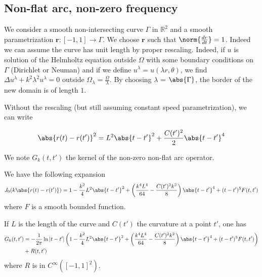 \documentclass[]{article}
\begin{document}
\subsection{Non-flat arc, non-zero frequency}


We consider a smooth non-intersecting curve $\Gamma$ in $\mathbb{R}^2$ and a smooth parametrization $\textbf{r}: [-1,1] \to \Gamma$. We choose $\textbf{r}$ such that $\norm{\frac{dr}{dt}} = 1$. Indeed we can assume the curve has unit length by proper rescaling. Indeed, if $u$ is solution of the Helmholtz equation outside $\Omega$ with some boundary conditions on $\Gamma$ (Dirichlet or Neuman) and if we define $u^\lambda = u(\lambda r, \theta)$, we find $\Delta u^{\lambda} + k^2 \lambda^2 u^{\lambda} = 0$ outside $\Omega_{\lambda} = \frac{\Omega}{\lambda}$. By choosing $\lambda$ = $\abs{\Gamma}$, the border of the new domain is of length $1$. 

Without the rescaling (but still assuming constant speed parametrization), we can write 

\[\abs{r(t) - r(t')}^2 = L^2\abs{t-t'}^2 + \frac{C(t')^2}{2}\abs{t-t'}^4\]


We note $G_k(t,t')$ the kernel of the non-zero non-flat arc operator. 

\begin{Lem}
	We have the following expansion
	\[J_0(k\abs{r(t) - r(t')}) = 1 - \frac{k^2}{4}L^2\abs{t-t'}^2 + \left(\frac{k^4L^4}{64} -\frac{C(t')^2k^2}{8}\right)\abs{t-t'}^4 + (t-t')^5 F(t,t')\]
	where $F$ is a smooth bounded function. 
\end{Lem}

\begin{Lem} If $L$ is the length of the curve and $C(t')$ the curvature at a point $t'$, one has
	\begin{align*}G_k(t,t') &= -\frac{1}{2\pi} \ln|t-t'|\left(1 - \frac{k^2}{4}L^2\abs{t-t'}^2 + \left(\frac{k^4L^4}{64} -\frac{C(t')^2k^2}{8}\right)\abs{t-t'}^4 + (t-t')^5 F(t,t')\right)\\
	 &+ R(t,t')
	 \end{align*}
	 where $R$ is in $C^{\infty}([-1,1]^2)$.
\end{Lem}
\end{document}

